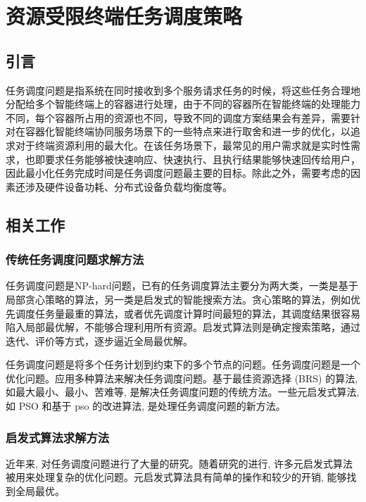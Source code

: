 \chapter{资源受限终端任务调度策略}\label{chap:task_scheduling}

\section{引言}

任务调度问题是指系统在同时接收到多个服务请求任务的时候，将这些任务合理地分配给多个智能终端上的容器进行处理，由于不同的容器所在智能终端的处理能力不同，每个容器所占用的资源也不同，导致不同的调度方案结果会有差异，需要针对在容器化智能终端协同服务场景下的一些特点来进行取舍和进一步的优化，以追求对于终端资源利用的最大化。在该任务场景下，最常见的用户需求就是实时性需求，也即要求任务能够被快速响应、快速执行、且执行结果能够快速回传给用户，因此最小化任务完成时间是任务调度问题最主要的目标。除此之外，需要考虑的因素还涉及硬件设备功耗、分布式设备负载均衡度等。

\section{相关工作}

\subsection{传统任务调度问题求解方法}

任务调度问题是NP-hard问题，已有的任务调度算法主要分为两大类，一类是基于局部贪心策略的算法，另一类是启发式的智能搜索方法。贪心策略的算法，例如优先调度任务量最重的算法，或者优先调度计算时间最短的算法，其调度结果很容易陷入局部最优解，不能够合理利用所有资源。启发式算法则是确定搜索策略，通过迭代、评价等方式，逐步逼近全局最优解。

任务调度问题是将多个任务计划到约束下的多个节点的问题。任务调度问题是一个优化问题。应用多种算法来解决任务调度问题。基于最佳资源选择 (BRS) 的算法, 如最大最小、最小、苦难等, 是解决任务调度问题的传统方法。一些元启发式算法, 如 PSO 和基于 pso 的改进算法, 是处理任务调度问题的新方法。

\subsection{启发式算法求解方法}

近年来, 对任务调度问题进行了大量的研究。随着研究的进行, 许多元启发式算法被用来处理复杂的优化问题。元启发式算法具有简单的操作和较少的开销, 能够找到全局最优。

